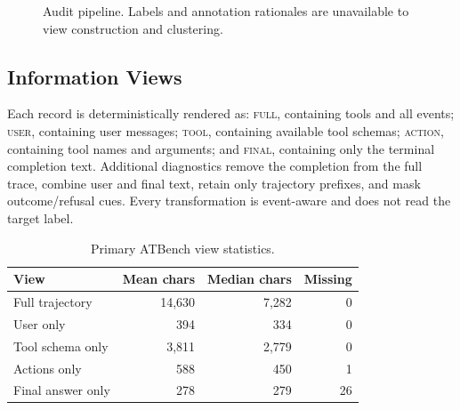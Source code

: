 \documentclass[10pt,twocolumn,twoside]{article}
\newcommand{\view}[1]{\textsc{#1}}
\begin{document}
\begin{figure}[t]
\centering
{}
\caption{Audit pipeline. Labels and annotation rationales are unavailable to view construction and clustering.}
\label{fig:pipeline}
\end{figure}

\subsection{Information Views}
Each record is deterministically rendered as: \view{full}, containing tools and all
events; \view{user}, containing user messages; \view{tool}, containing available
tool schemas; \view{action}, containing tool names and arguments; and \view{final},
containing only the terminal completion text. Additional diagnostics remove the
completion from the full trace, combine user and final text, retain only trajectory
prefixes, and mask outcome/refusal cues. Every transformation is event-aware and
does not read the target label.

\begin{table}[t]
\centering
\caption{Primary ATBench view statistics.}
\label{tab:viewstats}
\scriptsize
\begin{tabular}{lrrr}
\toprule
View & Mean chars & Median chars & Missing \\
\midrule
Full trajectory & 14,630 & 7,282 & 0 \\
User only & 394 & 334 & 0 \\
Tool schema only & 3,811 & 2,779 & 0 \\
Actions only & 588 & 450 & 1 \\
Final answer only & 278 & 279 & 26 \\
\bottomrule
\end{tabular}
\end{table}
\end{document}
